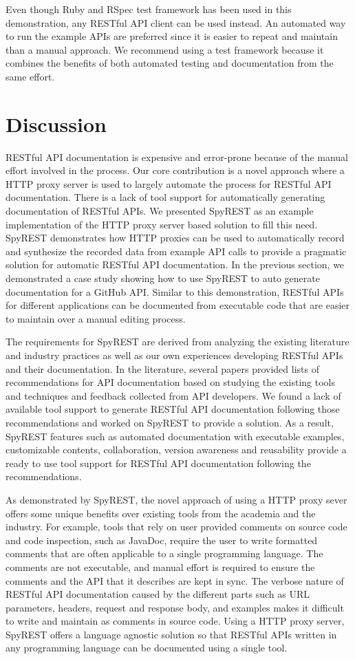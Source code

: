\documentclass[conference]{IEEEtran}
\begin{document}
Even though Ruby and RSpec test framework has been used in this demonstration, any RESTful API client can be used instead. An automated way to run the example APIs are preferred since it is easier to repeat and maintain than a manual approach. We recommend using a test framework because it combines the benefits of both automated testing and documentation from the same effort.

\section{Discussion}
RESTful API documentation is expensive and error-prone because of the manual effort involved in the process. Our core contribution is a novel approach where a HTTP proxy server is used to largely automate the process for RESTful API documentation. There is a lack of tool support for automatically generating documentation of RESTful APIs. We presented SpyREST as an example implementation of the HTTP proxy server based solution to fill this need. SpyREST demonstrates how HTTP proxies can be used to automatically record and synthesize the recorded data from example API calls to provide a pragmatic solution for automatic RESTful API documentation. In the previous section, we demonstrated a case study showing how to use SpyREST to auto generate documentation for a GitHub API. Similar to this demonstration, RESTful APIs for different applications can be documented from executable code that are easier to maintain over a manual editing process.

The requirements for SpyREST are derived from analyzing the existing literature and industry practices as well as our own experiences developing RESTful APIs and their documentation. In the literature, several papers provided lists of recommendations for API documentation based on studying the existing tools and techniques and feedback collected from API developers. We found a lack of available tool support to generate RESTful API documentation following those recommendations and worked on SpyREST to provide a solution. As a result, SpyREST features such as automated documentation with executable examples, customizable contents, collaboration, version awareness and reusability provide a ready to use tool support for RESTful API documentation following the recommendations.

As demonstrated by SpyREST, the novel approach of using a HTTP proxy sever offers some unique benefits over existing tools from the academia and the industry. For example, tools that rely on user provided comments on source code and code inspection, such as JavaDoc, require the user to write formatted comments that are often applicable to a single programming language. The comments are not executable, and manual effort is required to ensure the comments and the API that it describes are kept in sync. The verbose nature of RESTful API documentation caused by the different parts such as URL parameters, headers, request and response body, and examples makes it difficult to write and maintain as comments in source code. Using a HTTP proxy server, SpyREST offers a language agnostic solution so that RESTful APIs written in any programming language can be documented using a single tool.
\end{document}
